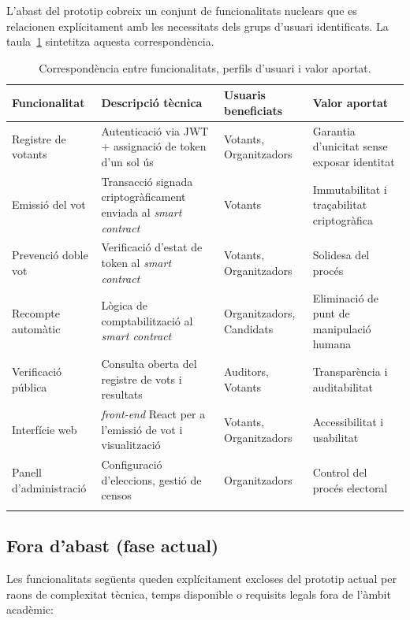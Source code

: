 \documentclass[12pt,a4paper,catalan]{article}
\begin{document}
L'abast del prototip cobreix un conjunt de funcionalitats nuclears que es relacionen explícitament amb les necessitats dels grups d'usuari identificats. La taula~\ref{tab:abast} sintetitza aquesta correspondència.

\begin{longtable}{p{4cm}p{4cm}p{2.5cm}p{3.5cm}}
    \toprule
    \textbf{Funcionalitat} & \textbf{Descripció tècnica} & \textbf{Usuaris beneficiats} & \textbf{Valor aportat} \\
    \midrule
    Registre de votants & Autenticació via JWT + assignació de token d'un sol ús & Votants, Organitzadors & Garantia d'unicitat sense exposar identitat \\
    \addlinespace
    Emissió del vot & Transacció signada criptogràficament enviada al \textit{smart contract} & Votants & Immutabilitat i traçabilitat criptogràfica \\
    \addlinespace
    Prevenció doble vot & Verificació d'estat de token al \textit{smart contract} & Votants, Organitzadors & Solidesa del procés \\
    \addlinespace
    Recompte automàtic & Lògica de comptabilització al \textit{smart contract} & Organitzadors, Candidats & Eliminació de punt de manipulació humana \\
    \addlinespace
    Verificació pública & Consulta oberta del registre de vots i resultats & Auditors, Votants & Transparència i auditabilitat \\
    \addlinespace
    Interfície web & \textit{front-end} React per a l'emissió de vot i visualització & Votants, Organitzadors & Accessibilitat i usabilitat \\
    \addlinespace
    Panell d'administració & Configuració d'eleccions, gestió de censos & Organitzadors & Control del procés electoral \\
    \bottomrule
    \caption{Correspondència entre funcionalitats, perfils d'usuari i valor aportat.}
    \label{tab:abast}
\end{longtable}

\subsection{Fora d'abast (fase actual)}

Les funcionalitats següents queden explícitament excloses del prototip actual per raons de complexitat tècnica, temps disponible o requisits legals fora de l'àmbit acadèmic:
\end{document}
